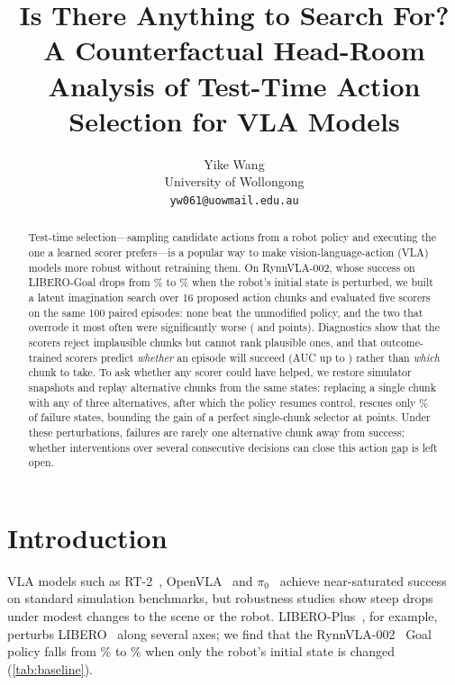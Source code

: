 \documentclass{article}
\title{Is There Anything to Search For? A Counterfactual Head-Room Analysis of Test-Time Action Selection for VLA Models}
\author{
  Yike Wang\\
  University of Wollongong\\
  \texttt{yw061@uowmail.edu.au}
}
\begin{document}
\maketitle

\begin{abstract}
Test-time selection---sampling candidate actions from a robot policy and executing the one a learned scorer prefers---is a popular way to make vision-language-action (VLA) models more robust without retraining them. On RynnVLA-002, whose success on LIBERO-Goal drops from \goalVanilla\% to \goalPlusRobot\% when the robot's initial state is perturbed, we built a latent imagination search over 16 proposed action chunks and evaluated five scorers on the same 100 paired episodes: none beat the unmodified policy, and the two that overrode it most often were significantly worse (\pilotDiff{} and \directDiff{} points). Diagnostics show that the scorers reject implausible chunks but cannot rank plausible ones, and that outcome-trained scorers predict \emph{whether} an episode will succeed (AUC up to \aucDirect) rather than \emph{which} chunk to take. To ask whether any scorer could have helped, we restore simulator snapshots and replay alternative chunks from the same states: replacing a single chunk with any of three alternatives, after which the policy resumes control, rescues only \rescPts\% of failure states, bounding the gain of a perfect single-chunk selector at \oracleGain{} points. Under these perturbations, failures are rarely one alternative chunk away from success; whether interventions over several consecutive decisions can close this action gap is left open.
\end{abstract}



\section{Introduction}

VLA models such as RT-2~\citep{brohan2023rt2}, OpenVLA~\citep{kim2024openvla} and $\pi_0$~\citep{black2024pi0} achieve near-saturated success on standard simulation benchmarks, but robustness studies show steep drops under modest changes to the scene or the robot. LIBERO-Plus~\citep{fei2025liberoplus}, for example, perturbs LIBERO~\citep{liu2023libero} along several axes; we find that the RynnVLA-002~\citep{cen2025rynnvla002} Goal policy falls from \goalVanilla\% to \goalPlusRobot\% when only the robot's initial state is changed (\cref{tab:baseline}).
\end{document}
